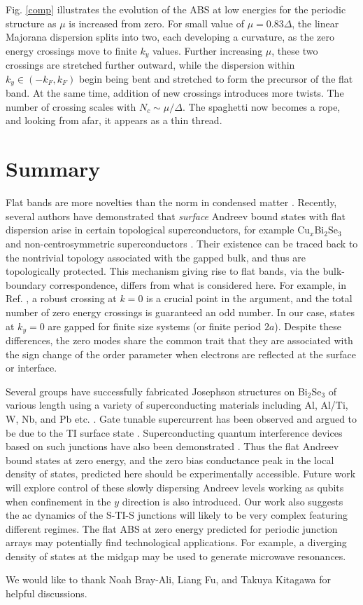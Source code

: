 Fig. \ref{comp} illustrates the evolution of the ABS at low energies for the periodic structure
as $\mu$ is increased from zero. For small value of $\mu=0.83 \Delta$, the linear Majorana dispersion splits
into two, each developing a curvature, as
the zero energy crossings move to finite $k_y$ values. Further increasing $\mu$,
these two crossings are stretched further outward, while the dispersion within $k_y\in(-k_F,k_F)$ 
begin being bent and stretched to form the precursor of the flat band. At the same time,
addition of new crossings introduces more twists. The number of crossing scales with $N_c\sim \mu/\Delta$.
The spaghetti now becomes a rope, and looking from
afar, it appears as a thin thread.

\section{Summary}
Flat bands are more novelties than the norm in condensed matter \cite{heikkila_flat_2011}. Recently, several authors have
demonstrated that {\it surface} Andreev bound states with flat dispersion arise in certain topological 
superconductors, for example Cu$_x$Bi$_2$Se$_3$ \cite{hsieh_majorana_2012} and 
non-centrosymmetric superconductors \cite{PhysRevB.84.020501, schnyder_topological_2011}. 
Their existence can be traced
back to the nontrivial topology associated with the gapped bulk, and thus are topologically protected. 
This mechanism giving rise to flat bands, via the bulk-boundary correspondence,
differs from what is considered here. For example, in Ref. \cite{hsieh_majorana_2012},
a robust crossing at $k=0$ is a crucial point in the argument, and the total number of zero energy 
crossings is guaranteed an odd number. In our case, states at $k_y=0$ are gapped
for finite size systems (or finite period $2a$). Despite these differences, the
zero modes share the common trait that they are associated with the sign change of the order parameter
when electrons are reflected at the surface or interface.


Several groups have successfully fabricated Josephson structures on Bi$_2$Se$_3$ of various
length using a variety of 
superconducting materials including Al, Al/Ti, W, Nb, and Pb etc. \cite{SacACpAC:2011vn,
PhysRevB.84.165120,
Veldhorst:2012uq,Qu:2012kx,2012arXiv1202.2323W}. 
Gate tunable supercurrent
has been observed and argued to be due to the TI surface state \cite{SacACpAC:2011vn}. Superconducting quantum 
interference devices based on such junctions have also been demonstrated \cite{2011arXiv1112.5858V,Qu:2012kx}. 
Thus the flat
Andreev bound states at zero energy, and the zero bias conductance peak in the local 
density of states, predicted here should be experimentally accessible. 
Future work will explore control of these slowly dispersing Andreev levels
working as qubits \cite{PhysRevLett.90.087003}
when confinement in the $y$ direction is also introduced. Our work
also suggests the ac dynamics of the S-TI-S junctions will likely to be very complex
featuring different regimes.
The flat ABS at zero energy predicted for periodic junction arrays may potentially find 
technological applications. For example, a diverging density of states at the midgap
may be used to generate microwave resonances.

We would like to thank Noah Bray-Ali, Liang Fu, and Takuya Kitagawa for helpful discussions.



